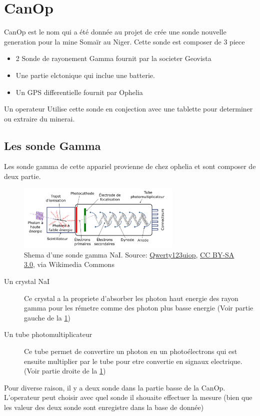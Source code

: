 \section{CanOp}
CanOp est le nom qui a été donnée au projet de crée une sonde nouvelle generation pour la mine Somaïr au Niger. Cette sonde est composer de 3 piece 
\begin{itemize}
    \item 2 Sonde de rayonement Gamma fournit par la societer Geovista
    \item Une partie elctonique qui inclue une batterie.
    \item Un GPS differentielle fournit par Ophelia 
\end{itemize}
Un operateur Utilise cette sonde en conjection avec une tablette pour determiner ou extraire du minerai. 
\subsection{Les sonde Gamma}
\label{ssec:sonde}
Les sonde gamma de cette appariel provienne de chez ophelia et sont composer de deux partie.
\begin{figure}
    \centering
    \includegraphics[width=0.7\textwidth]{img/she/Photomultiplier_coupled_to_a_scintillator_-_fr.png}
    \caption[Shema d'une sonde gamma NaI]{Shema d'une sonde gamma NaI. Source: \href{https://commons.wikimedia.org/wiki/File:Photomultiplier_coupled_to_a_scintillator_-_fr.png}{Qwerty123uiop}, \href{https://creativecommons.org/licenses/by-sa/3.0}{CC BY-SA 3.0}, via Wikimedia Commons}
    \label{fig:detecteur_gamma}
\end{figure}
\begin{description}
    \item[Un crystal NaI] Ce crystal a la propriete d'absorber les photon haut energie des rayon gamma pour les rémetre comme des photon plus basse energie (Voir partie gauche de la \cref{fig:detecteur_gamma}) \cite{site:explication_NaI}
    \item[Un tube photomultiplicateur] Ce tube permet de convertire un photon en un photoélectrons qui est ensuite multiplier par le tube pour etre convertie en signaux electrique. (Voir partie droite de la \cref{fig:detecteur_gamma}) \cite{site:explication_NaI}
\end{description}
Pour diverse raison, il y a deux sonde dans la partie basse de la CanOp. L'operateur peut choisir avec quel sonde il shouaite effectuer la mesure (bien que les valeur des deux sonde sont enregistre dans la base de donnée)

